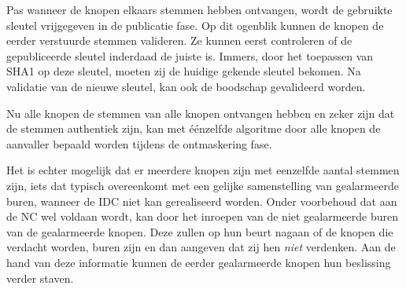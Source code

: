 Pas wanneer de knopen elkaars stemmen hebben ontvangen, wordt de gebruikte
sleutel vrijgegeven in de publicatie fase. Op dit ogenblik kunnen de knopen de
eerder verstuurde stemmen valideren. Ze kunnen eerst controleren of de
gepubliceerde sleutel inderdaad de juiste is. Immers, door het toepassen van
SHA1 op deze sleutel, moeten zij de huidige gekende sleutel bekomen. Na
validatie van de nieuwe sleutel, kan ook de boodschap gevalideerd worden.

Nu alle knopen de stemmen van alle knopen ontvangen hebben en zeker zijn dat de
stemmen authentiek zijn, kan met \'e\'enzelfde algoritme door alle knopen de
aanvaller bepaald worden tijdens de ontmaskering fase.

Het is echter mogelijk dat er meerdere knopen zijn met eenzelfde aantal stemmen
zijn, iets dat typisch overeenkomt met een gelijke samenstelling van
gealarmeerde buren, wanneer de IDC niet kan gerealiseerd worden. Onder
voorbehoud dat aan de NC wel voldaan wordt, kan door het inroepen van de niet
gealarmeerde buren van de gealarmeerde knopen. Deze zullen op hun beurt nagaan
of de knopen die verdacht worden, buren zijn en dan aangeven dat zij hen
\emph{niet} verdenken. Aan de hand van deze informatie kunnen de eerder
gealarmeerde knopen hun beslissing verder staven.
